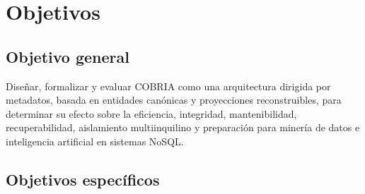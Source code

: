 \section{Objetivos}

\subsection{Objetivo general}

Diseñar, formalizar y evaluar COBRIA como una arquitectura dirigida por metadatos,
basada en entidades canónicas y proyecciones reconstruibles, para determinar su efecto
sobre la eficiencia, integridad, mantenibilidad, recuperabilidad, aislamiento
multiinquilino y preparación para minería de datos e inteligencia artificial en sistemas
NoSQL.

\subsection{Objetivos específicos}

